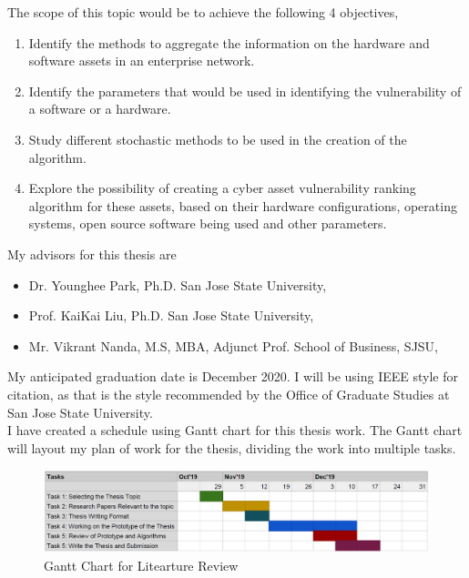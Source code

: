 \documentclass[letterpaper,12pt]{texMemo}
\begin{document}
The scope of this topic would be to achieve the following 4 objectives,

\begin{enumerate}
    \item  Identify the methods to aggregate the information on the hardware and software assets in an enterprise network.
    \item  Identify the parameters that would be used in identifying the vulnerability of a software or a hardware.
    \item  Study different stochastic methods to be used in the creation of the algorithm.
    \item  Explore the possibility of creating a cyber asset vulnerability ranking algorithm for these assets, based on their hardware configurations, operating systems, open source software being used and other parameters.
\end{enumerate}

\noindent My advisors for this thesis are
\begin{itemize}
   \item  Dr. Younghee Park, Ph.D. San Jose State University,
   \item  Prof. KaiKai Liu, Ph.D. San Jose State University,
   \item  Mr. Vikrant Nanda, M.S, MBA, Adjunct Prof. School of Business, SJSU,
\end{itemize}

\noindent My anticipated graduation date is December 2020. I will be using IEEE style for citation, as that is the style recommended by the Office of Graduate Studies at San Jose State University. \\

\noindent I have created a schedule using Gantt chart for this thesis work. The Gantt chart will layout my plan of work for the thesis, dividing the work into multiple tasks. \\

\begin{figure}[h!]
    \centerline{\includegraphics[scale=.45]{GaantChartThesis.PNG}}
    \caption{Gantt Chart for Litearture Review}
\end{figure}
\end{document}
